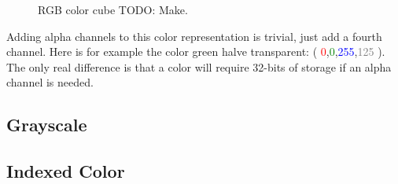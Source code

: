 \begin{refsection}
\begin{figure}[h!]
\begin{tikzpicture}
  \end{tikzpicture}
  \caption{RGB color cube TODO: Make.}
  \label{fig:color-cube}
\end{figure}

\newcommand{\rgbaquad}[4]{(
  \textcolor{red}{#1},\textcolor{green}{#2},\textcolor{blue}{#3},\textcolor{gray}{#4} )}

Adding alpha channels to this color representation is trivial, just
add a fourth channel. Here is for example the color green halve
transparent: \rgbaquad{0}{0}{255}{125}. The only real difference is
that a color will require 32-bits of storage if an alpha channel is needed.

\subsection{Grayscale}
\label{sec:other-colors-depths}


\subsection{Indexed Color}
\label{sec:indexed-color}


\printbibliography[heading=subbibliography]
\end{refsection}